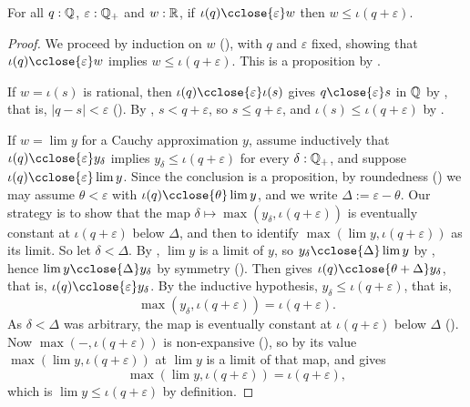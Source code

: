 \begin{lemma}
  \label{ratCloseLeRatPlusReal}
  For all $q : \mathbb{Q}$, $\varepsilon : \mathbb{Q}_{+}$ and $w : \mathbb{R}$, if $\iota(q) \cclose{\varepsilon} w$ then $w \le \iota(q + \varepsilon)$.
\end{lemma}
\begin{proof}
  We proceed by induction on $w$ (), with $q$ and $\varepsilon$ fixed, showing that $\iota(q) \cclose{\varepsilon} w$ implies $w \le \iota(q + \varepsilon)$. This is a proposition by .

  If $w = \iota(s)$ is rational, then $\iota(q) \cclose{\varepsilon} \iota(s)$ gives $q \close{\varepsilon} s$ in $\mathbb{Q}$ by , that is, $\lvert q - s \rvert < \varepsilon$ (). By , $s < q + \varepsilon$, so $s \le q + \varepsilon$, and $\iota(s) \le \iota(q + \varepsilon)$ by .

  If $w = \lim y$ for a Cauchy approximation $y$, assume inductively that $\iota(q) \cclose{\varepsilon} y_\delta$ implies $y_\delta \le \iota(q + \varepsilon)$ for every $\delta : \mathbb{Q}_{+}$, and suppose $\iota(q) \cclose{\varepsilon} \lim y$. Since the conclusion is a proposition, by roundedness () we may assume $\theta < \varepsilon$ with $\iota(q) \cclose{\theta} \lim y$, and we write $\Delta := \varepsilon - \theta$. Our strategy is to show that the map $\delta \mapsto \max(y_\delta, \iota(q + \varepsilon))$ is eventually constant at $\iota(q + \varepsilon)$ below $\Delta$, and then to identify $\max(\lim y, \iota(q + \varepsilon))$ as its limit. So let $\delta < \Delta$. By , $\lim y$ is a limit of $y$, so $y_\delta \cclose{\Delta} \lim y$ by , hence $\lim y \cclose{\Delta} y_\delta$ by symmetry (). Then  gives $\iota(q) \cclose{\theta + \Delta} y_\delta$, that is, $\iota(q) \cclose{\varepsilon} y_\delta$. By the inductive hypothesis, $y_\delta \le \iota(q + \varepsilon)$, that is,
  \[
    \max(y_\delta, \iota(q + \varepsilon)) = \iota(q + \varepsilon).
  \]
  As $\delta < \Delta$ was arbitrary, the map is eventually constant at $\iota(q + \varepsilon)$ below $\Delta$ (). Now $\max(-, \iota(q + \varepsilon))$ is non-expansive (), so by  its value $\max(\lim y, \iota(q + \varepsilon))$ at $\lim y$ is a limit of that map, and  gives
  \[
    \max(\lim y, \iota(q + \varepsilon)) = \iota(q + \varepsilon),
  \]
  which is $\lim y \le \iota(q + \varepsilon)$ by definition.
\end{proof}

